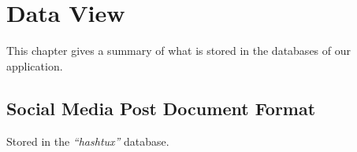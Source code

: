 \chapter{Data View}
This chapter gives a summary of what is stored in the databases of our
application.

\section{Social Media Post Document Format}
Stored in the \textit{``hashtux''} database. \\ \\
